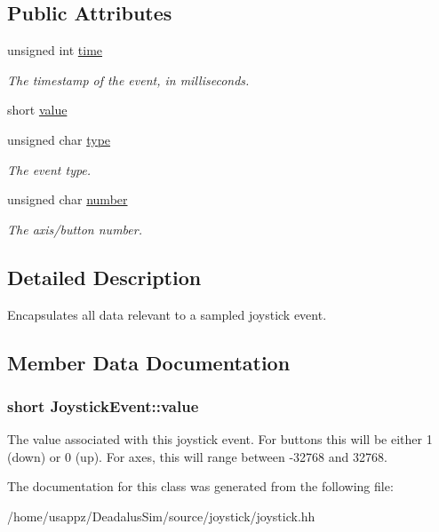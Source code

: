 \subsection*{\-Public \-Attributes}
\begin{DoxyCompactItemize}
\item 
\hypertarget{classJoystickEvent_a5daa361798dd403ff4dd771fca60ede0}{unsigned int \hyperlink{classJoystickEvent_a5daa361798dd403ff4dd771fca60ede0}{time}}\label{classJoystickEvent_a5daa361798dd403ff4dd771fca60ede0}

\begin{DoxyCompactList}\small\item\em \-The timestamp of the event, in milliseconds. \end{DoxyCompactList}\item 
short \hyperlink{classJoystickEvent_a52cd09ad823d2eec682657f27485109d}{value}
\item 
\hypertarget{classJoystickEvent_ada8aabcfb833ec362a3d8b2502d26951}{unsigned char \hyperlink{classJoystickEvent_ada8aabcfb833ec362a3d8b2502d26951}{type}}\label{classJoystickEvent_ada8aabcfb833ec362a3d8b2502d26951}

\begin{DoxyCompactList}\small\item\em \-The event type. \end{DoxyCompactList}\item 
\hypertarget{classJoystickEvent_a786468a9d3ad11577fdbd64292d8bc06}{unsigned char \hyperlink{classJoystickEvent_a786468a9d3ad11577fdbd64292d8bc06}{number}}\label{classJoystickEvent_a786468a9d3ad11577fdbd64292d8bc06}

\begin{DoxyCompactList}\small\item\em \-The axis/button number. \end{DoxyCompactList}\end{DoxyCompactItemize}


\subsection{\-Detailed \-Description}
\-Encapsulates all data relevant to a sampled joystick event. 

\subsection{\-Member \-Data \-Documentation}
\hypertarget{classJoystickEvent_a52cd09ad823d2eec682657f27485109d}{
\subsubsection[{value}]{\setlength{\rightskip}{0pt plus 5cm}short {\bf \-Joystick\-Event\-::value}}}\label{classJoystickEvent_a52cd09ad823d2eec682657f27485109d}
\-The value associated with this joystick event. \-For buttons this will be either 1 (down) or 0 (up). \-For axes, this will range between -\/32768 and 32768. 

\-The documentation for this class was generated from the following file\-:\begin{DoxyCompactItemize}
\item 
/home/usappz/\-Deadalus\-Sim/source/joystick/joystick.\-hh\end{DoxyCompactItemize}
